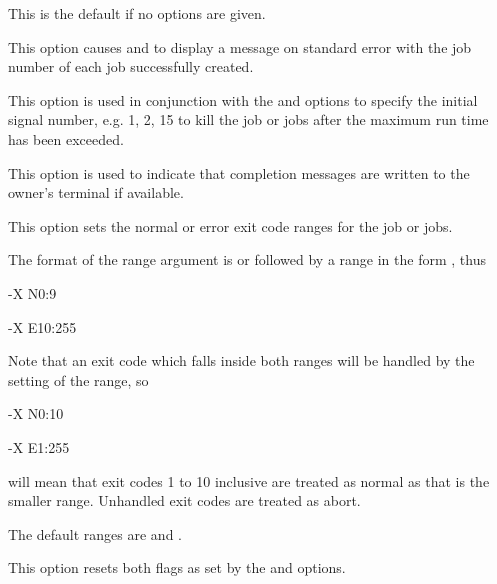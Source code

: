 This is the default if no options are given.


This option causes \PrBtr{} and \PrRbtr{} to display a message on standard error with the job number of each job successfully created.


This option is used in conjunction with the  and  options to specify the initial signal number, e.g.
1, 2, 15 to kill the job or jobs after the maximum run time has been exceeded.


This option is used to indicate that completion messages are written to the owner's terminal if available.


This option sets the normal or error exit code ranges for the job or jobs.

The format of the range argument is  or  followed by a range in the form , thus

\begin{expara}

{}-X N0:9

{}-X E10:255

\end{expara}

Note that an exit code which falls inside both ranges will be handled by the setting of the  range, so

\begin{expara}

{}-X N0:10

{}-X E1:255

\end{expara}

will mean that exit codes 1 to 10 inclusive are treated as normal as that is the smaller range. Unhandled exit codes are treated
as abort.

The default ranges are  and .


This option resets both flags as set by the  and  options.


